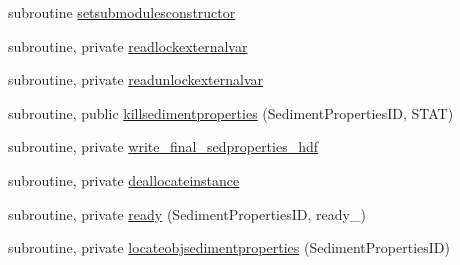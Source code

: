 \begin{DoxyCompactItemize}
subroutine \mbox{\hyperlink{namespacemodulesedimentproperties_acc4f3e2fa34ac7c083b5c86382b68a59}{setsubmodulesconstructor}}
\item 
subroutine, private \mbox{\hyperlink{namespacemodulesedimentproperties_a395db65fca9389b9904d43f9fc450c03}{readlockexternalvar}}
\item 
subroutine, private \mbox{\hyperlink{namespacemodulesedimentproperties_a442696b0f51e8020b42b7a5c2af05721}{readunlockexternalvar}}
\item 
subroutine, public \mbox{\hyperlink{namespacemodulesedimentproperties_a69dda6f50e9b65498825a76aa325a968}{killsedimentproperties}} (Sediment\+Properties\+ID, S\+T\+AT)
\item 
subroutine, private \mbox{\hyperlink{namespacemodulesedimentproperties_ac2dfd3d9cf57dcc8a9d3533203128931}{write\+\_\+final\+\_\+sedproperties\+\_\+hdf}}
\item 
subroutine, private \mbox{\hyperlink{namespacemodulesedimentproperties_a2d719466ca9047ba28957d7df363ad7b}{deallocateinstance}}
\item 
subroutine, private \mbox{\hyperlink{namespacemodulesedimentproperties_a0ac80b6b6970285688cd69f623317e33}{ready}} (Sediment\+Properties\+ID, ready\+\_\+)
\item 
subroutine, private \mbox{\hyperlink{namespacemodulesedimentproperties_a8bdf617b0165523af238758f5b5a5767}{locateobjsedimentproperties}} (Sediment\+Properties\+ID)
\end{DoxyCompactItemize}

